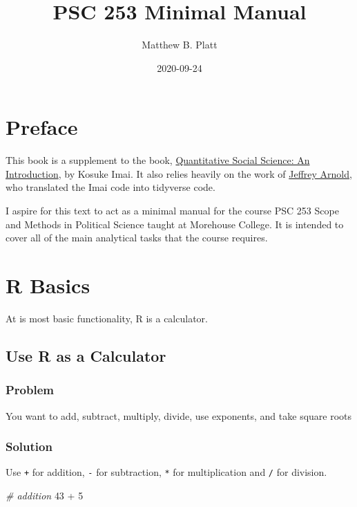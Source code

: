 \documentclass[]{book}
\title{PSC 253 Minimal Manual}
\author{Matthew B. Platt}
\date{2020-09-24}
\newenvironment{Shaded}{\begin{snugshade}}{\end{snugshade}}
\newcommand{\DecValTok}[1]{\textcolor[rgb]{0.00,0.00,0.81}{{#1}}}
\newcommand{\StringTok}[1]{\textcolor[rgb]{0.31,0.60,0.02}{{#1}}}
\newcommand{\CommentTok}[1]{\textcolor[rgb]{0.56,0.35,0.01}{\textit{{#1}}}}
\newcommand{\NormalTok}[1]{{#1}}
\begin{document}
\maketitle

{
\setcounter{tocdepth}{1}
\tableofcontents
}
\chapter*{Preface}\label{preface}

This book is a supplement to the book,
\href{http://qss.princeton.press/}{Quantitative Social Science: An
Introduction}, by Kosuke Imai. It also relies heavily on the work of
\href{https://jrnold.github.io/qss-tidy/}{Jeffrey Arnold}, who
translated the Imai code into tidyverse code.

I aspire for this text to act as a minimal manual for the course PSC 253
Scope and Methods in Political Science taught at Morehouse College. It
is intended to cover all of the main analytical tasks that the course
requires.

\chapter{R Basics}\label{basic}

At is most basic functionality, R is a calculator.

\section{Use R as a Calculator}\label{calculate}

\subsection{Problem}\label{problem}

You want to add, subtract, multiply, divide, use exponents, and take
square roots

\subsection{Solution}\label{solution}

Use \texttt{+} for addition, \texttt{-} for subtraction, \texttt{*} for
multiplication and \texttt{/} for division.

\begin{Shaded}
\begin{Highlighting}[]
\CommentTok{# addition}
\DecValTok{43} \NormalTok{+}\StringTok{ }\DecValTok{5}
\end{Highlighting}
\end{Shaded}
\end{document}
